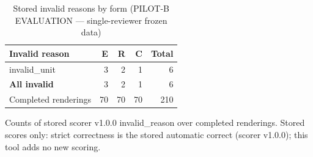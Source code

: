\begin{table}[t]
\centering
\small
\caption{Stored invalid reasons by form (PILOT-B EVALUATION --- single-reviewer frozen data)}
\label{tab:pilotb-Qwen3-4B-invalid}
\begin{tabular}{lrrrr}
\toprule
Invalid reason & E & R & C & Total \\
\midrule
invalid\_unit & 3 & 2 & 1 & 6 \\
\textbf{All invalid} & 3 & 2 & 1 & 6 \\
Completed renderings & 70 & 70 & 70 & 210 \\
\bottomrule
\end{tabular}
\par\smallskip
\parbox{\linewidth}{\footnotesize Counts of stored scorer v1.0.0 invalid\_reason over completed renderings. Stored scores only: strict correctness is the stored automatic correct (scorer v1.0.0); this tool adds no new scoring.}
\end{table}
